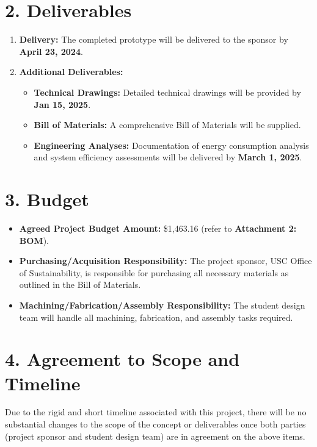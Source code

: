 \documentclass[12pt]{article}
\begin{document}
\section*{2. Deliverables}
\begin{enumerate}
    \item \textbf{Delivery:} The completed prototype will be delivered to the sponsor by \textbf{April 23, 2024}.
    \item \textbf{Additional Deliverables:}
    \begin{itemize}
        \item \textbf{Technical Drawings:} Detailed technical drawings will be provided by \textbf{Jan 15, 2025}.
        \item \textbf{Bill of Materials:} A comprehensive Bill of Materials will be supplied.
        \item \textbf{Engineering Analyses:} Documentation of energy consumption analysis and system efficiency assessments will be delivered by \textbf{March 1, 2025}.
    \end{itemize}
\end{enumerate}

\section*{3. Budget}
\begin{itemize}
    \item \textbf{Agreed Project Budget Amount:} \$1,463.16 (refer to \textbf{Attachment 2: BOM}).
    \item \textbf{Purchasing/Acquisition Responsibility:} The project sponsor, USC Office of Sustainability, is responsible for purchasing all necessary materials as outlined in the Bill of Materials.
    \item \textbf{Machining/Fabrication/Assembly Responsibility:} The student design team will handle all machining, fabrication, and assembly tasks required.
\end{itemize}

\section*{4. Agreement to Scope and Timeline}
Due to the rigid and short timeline associated with this project, there will be no substantial changes to the scope of the concept or deliverables once both parties (project sponsor and student design team) are in agreement on the above items.
\end{document}
